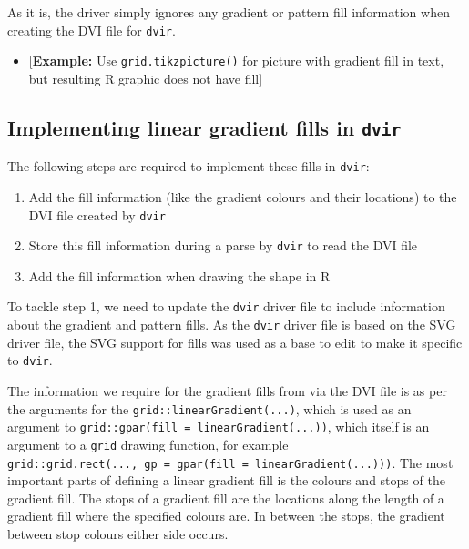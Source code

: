 \documentclass[]{article}
\providecommand{\tightlist}{%
  \setlength{\itemsep}{0pt}\setlength{\parskip}{0pt}}
\begin{document}
As it is, the \Tikz{} driver simply ignores any gradient or pattern fill
information when creating the DVI file for \texttt{dvir}.

\begin{itemize}
\tightlist
\item
  {[}\textbf{Example:} Use \texttt{grid.tikzpicture()} for picture with
  gradient fill in text, but resulting R graphic does not have fill{]}
\end{itemize}

\subsection{\texorpdfstring{Implementing \Tikz{} linear gradient fills
in
\texttt{dvir}\label{tikzWorkflow}}{Implementing  linear gradient fills in dvir}}\label{implementing-linear-gradient-fills-in-dvir}

The following steps are required to implement these \Tikz{} fills in
\texttt{dvir}:

\begin{enumerate}
\def\labelenumi{\arabic{enumi}.}
\item
  Add the fill information (like the gradient colours and their
  locations) to the DVI file created by \texttt{dvir}
\item
  Store this fill information during a parse by \texttt{dvir} to read
  the DVI file
\item
  Add the fill information when drawing the shape in R
\end{enumerate}

To tackle step 1, we need to update the \texttt{dvir} \Tikz{} driver
file to include information about the gradient and pattern fills. As the
\texttt{dvir} \Tikz{} driver file is based on the SVG \Tikz{} driver
file, the SVG support for \Tikz{} fills was used as a base to edit to
make it specific to \texttt{dvir}.

The information we require for the gradient fills from \Tikz{} via the
DVI file is as per the arguments for the
\texttt{grid::linearGradient(...)}, which is used as an argument to
\texttt{grid::gpar(fill\ =\ linearGradient(...))}, which itself is an
argument to a \texttt{grid} drawing function, for example
\texttt{grid::grid.rect(...,\ gp\ =\ gpar(fill\ =\ linearGradient(...)))}.
The most important parts of defining a linear gradient fill is the
colours and stops of the gradient fill. The stops of a gradient fill are
the locations along the length of a gradient fill where the specified
colours are. In between the stops, the gradient between stop colours
either side occurs.
\end{document}
